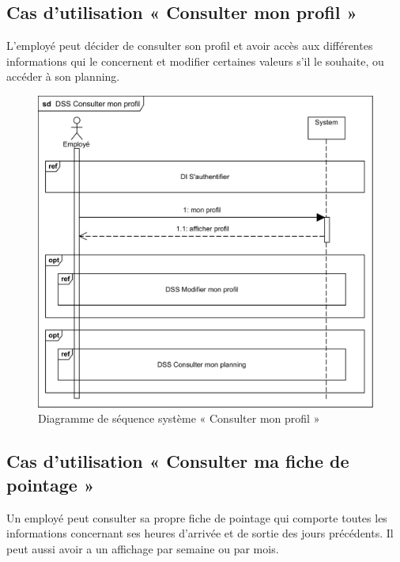 \subsection{Cas d'utilisation « Consulter mon profil »}
L’employé peut décider de consulter son profil et avoir accès aux différentes
informations qui le concernent et modifier certaines valeurs s’il le souhaite, 
ou accéder à son planning. 
 
\begin{figure}[h!]
     \centering
     \includegraphics[scale=0.9]{images/DSS/DSS Consulter mon profil.png}
     \caption{Diagramme de séquence système « Consulter mon profil »}
     \label{fig4}
\end{figure}

\subsection{Cas d'utilisation « Consulter ma  fiche de pointage »}
Un employé peut consulter sa propre fiche de pointage qui comporte toutes les
informations concernant ses heures d’arrivée et de sortie des jours précédents.
Il peut aussi avoir a un affichage par semaine ou par mois.
   
